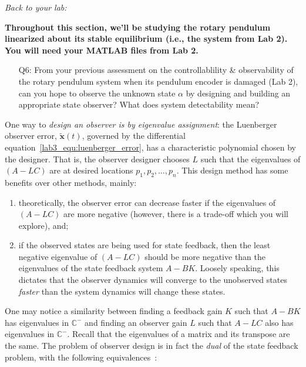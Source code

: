 \documentclass[12pt]{report}
\newcommand\drew[1]{\textcolor{red}{#1}}
\begin{document}
\noindent \emph{Back to your lab:}

\textbf{Throughout this section, we'll be studying the rotary pendulum linearized about its stable equilibrium (i.e., the system from Lab 2). You will need your MATLAB files from Lab 2.}
\begin{enumerate}[Question]
    \item[Q6:] From your previous assessment on the controllablility \& observability of the rotary pendulum system when its pendulum encoder is damaged (Lab 2), can you hope to observe the unknown state $\alpha$ by designing and building an appropriate state observer? What does system detectability mean?\\
\end{enumerate}
One way to \emph{design an observer is by eigenvalue assignment}: the Luenberger observer error, $\tilde{\mathbf{x}}(t)$, governed by the differential equation~\eqref{lab3_equ:luenberger_error}, has a characteristic polynomial chosen by the designer. That is, the observer designer chooses $L$ such that the eigenvalues of $(A-LC)$ are at desired locations $p_1, p_2, \dots, p_n$. This design method has some benefits over other methods, mainly:
\begin{enumerate}
    \item theoretically, the observer error can decrease faster if the eigenvalues of $(A-LC)$ are more negative (however, there is a trade-off which you will explore), and;
    \item if the observed states are being used for state feedback, then the least negative eigenvalue of $(A-LC)$ should be more negative than the eigenvalues of the state feedback system $A-BK$. Loosely speaking, this dictates that the observer dynamics will converge to the unobserved states \emph{faster} than the system dynamics will change these states.
\end{enumerate}
One may notice a similarity between finding a feedback gain $K$ such that $A-BK$ has eigenvalues in $\mathbb{C}^-$ and finding an observer gain $L$ such that $A-LC$ also has eigenvalues in $\mathbb{C}^-$. Recall that the eigenvalues of a matrix and its transpose are the same. The problem of observer design is in fact the \emph{dual} of the state feedback problem, with the following equivalences~\cite{astrom2010feedback}:
\end{document}
